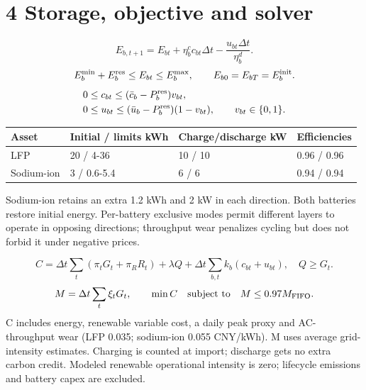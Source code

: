 \documentclass[10pt,a4paper]{article}
\begin{document}
\section*{4  Storage, objective and solver}
\begin{equation}
E_{b,t+1}=E_{bt}+\eta_b^c c_{bt}\Delta t-\frac{u_{bt}\Delta t}{\eta_b^d}.
\end{equation}
\begin{equation}
E_b^{\min}+E_b^{\rm res}\le E_{bt}\le E_b^{\max},\qquad E_{b0}=E_{bT}=E_b^{\rm init}.
\end{equation}
\begin{equation}
\begin{aligned}0&\le c_{bt}\le(\bar c_b-P_b^{\rm res})v_{bt},\\0&\le u_{bt}\le(\bar u_b-P_b^{\rm res})(1-v_{bt}),\qquad v_{bt}\in\{0,1\}.\end{aligned}
\end{equation}
\begin{center}\begingroup\setlength{\tabcolsep}{4pt}
\renewcommand{\arraystretch}{1.2}
\fontsize{8.3}{11.62}\selectfont
\begin{tabular}{@{}p{85.53pt}p{133.04pt}p{133.04pt}p{107.39pt}@{}}
\toprule
\textbf{Asset} & \textbf{Initial / limits kWh} & \textbf{Charge/discharge kW} & \textbf{Efficiencies} \\
\midrule
LFP & 20 / 4-36 & 10 / 10 & 0.96 / 0.96 \\
Sodium-ion & 3 / 0.6-5.4 & 6 / 6 & 0.94 / 0.94 \\
\bottomrule\end{tabular}\endgroup\end{center}

Sodium-ion retains an extra 1.2 kWh and 2 kW in each direction. Both batteries restore initial energy. Per-battery exclusive modes permit different layers to operate in opposing directions; throughput wear penalizes cycling but does not forbid it under negative prices.

\begin{equation}
C=\Delta t\sum_t(\pi_tG_t+\pi_RR_t)+\lambda Q+\Delta t\sum_{b,t}k_b(c_{bt}+u_{bt}),\quad Q\ge G_t.
\end{equation}
\begin{equation}
M=\Delta t\sum_t\xi_tG_t,\qquad \min C\quad\text{subject to}\quad M\le0.97M_{\rm FIFO}.
\end{equation}
C includes energy, renewable variable cost, a daily peak proxy and AC-throughput wear (LFP 0.035; sodium-ion 0.055 CNY/kWh). M uses average grid-intensity estimates. Charging is counted at import; discharge gets no extra carbon credit. Modeled renewable operational intensity is zero; lifecycle emissions and battery capex are excluded.
\end{document}
